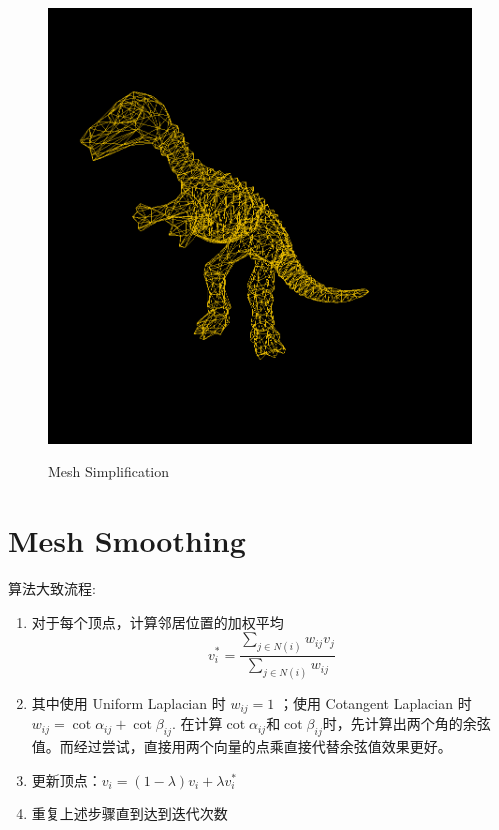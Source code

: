 \documentclass[12pt, a4paper]{ctexart}
\begin{document}
\begin{figure}[H]
{  \includegraphics[width=0.3\linewidth]{simplification_3.png}
    }
    \hspace{0.5in}
  \caption{Mesh Simplification}
\end{figure}
\section{Mesh Smoothing}
算法大致流程:

\begin{enumerate}
    \item 对于每个顶点，计算邻居位置的加权平均
        $$v_i^*=\frac{\sum_{j\in N(i)}w_{ij} v_j}{\sum_{j\in N(i)} w_{ij}}$$
    \item 其中使用 Uniform Laplacian 时 $w_{ij}=1$ ；使用 Cotangent Laplacian 时 $w_{ij}=\cot \alpha_{ij} + \cot \beta_{ij}$.
            在计算$\cot \alpha_{ij}$和$\cot \beta_{ij}$时，先计算出两个角的余弦值。而经过尝试，直接用两个向量的点乘直接代替余弦值效果更好。
    \item 更新顶点：$v_i=(1-\lambda)v_i+\lambda v_i^*$
    \item 重复上述步骤直到达到迭代次数
\end{enumerate}
\end{document}
